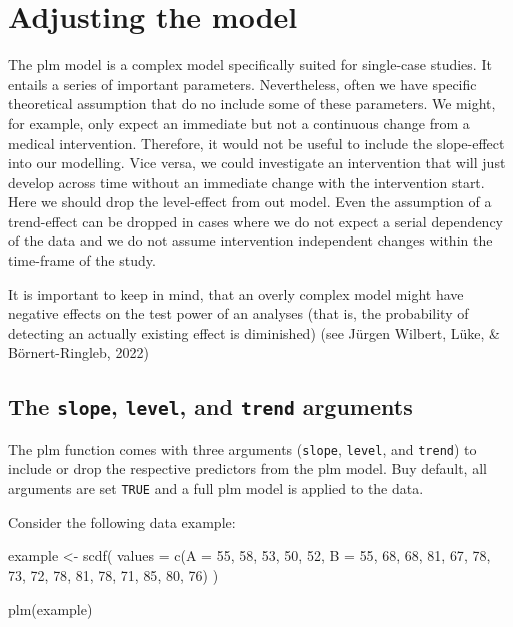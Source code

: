 \documentclass[
  letterpaper,
  DIV=11,
  numbers=noendperiod]{scrreprt}
\newenvironment{Shaded}{\begin{snugshade}}{\end{snugshade}}
\newcommand{\AttributeTok}[1]{\textcolor[rgb]{0.40,0.45,0.13}{#1}}
\newcommand{\DecValTok}[1]{\textcolor[rgb]{0.68,0.00,0.00}{#1}}
\newcommand{\FunctionTok}[1]{\textcolor[rgb]{0.28,0.35,0.67}{#1}}
\newcommand{\NormalTok}[1]{\textcolor[rgb]{0.00,0.23,0.31}{#1}}
\newcommand{\OtherTok}[1]{\textcolor[rgb]{0.00,0.23,0.31}{#1}}
\begin{document}
\hypertarget{adjusting-the-model}{%
\section{Adjusting the model}\label{adjusting-the-model}}

The plm model is a complex model specifically suited for single-case
studies. It entails a series of important parameters. Nevertheless,
often we have specific theoretical assumption that do no include some of
these parameters. We might, for example, only expect an immediate but
not a continuous change from a medical intervention. Therefore, it would
not be useful to include the slope-effect into our modelling. Vice
versa, we could investigate an intervention that will just develop
across time without an immediate change with the intervention start.
Here we should drop the level-effect from out model. Even the assumption
of a trend-effect can be dropped in cases where we do not expect a
serial dependency of the data and we do not assume intervention
independent changes within the time-frame of the study.

It is important to keep in mind, that an overly complex model might have
negative effects on the test power of an analyses (that is, the
probability of detecting an actually existing effect is diminished) (see
Jürgen Wilbert, Lüke, \& Börnert-Ringleb, 2022)

\hypertarget{the-slope-level-and-trend-arguments}{%
\subsection{\texorpdfstring{The \texttt{slope}, \texttt{level}, and
\texttt{trend}
arguments}{The slope, level, and trend arguments}}\label{the-slope-level-and-trend-arguments}}

The plm function comes with three arguments (\texttt{slope},
\texttt{level}, and \texttt{trend}) to include or drop the respective
predictors from the plm model. Buy default, all arguments are set
\texttt{TRUE} and a full plm model is applied to the data.

Consider the following data example:

\begin{Shaded}
\begin{Highlighting}[]
\NormalTok{example }\OtherTok{\textless{}{-}} \FunctionTok{scdf}\NormalTok{(}
   \AttributeTok{values =} \FunctionTok{c}\NormalTok{(}\AttributeTok{A =} \DecValTok{55}\NormalTok{, }\DecValTok{58}\NormalTok{, }\DecValTok{53}\NormalTok{, }\DecValTok{50}\NormalTok{, }\DecValTok{52}\NormalTok{, }
              \AttributeTok{B =} \DecValTok{55}\NormalTok{, }\DecValTok{68}\NormalTok{, }\DecValTok{68}\NormalTok{, }\DecValTok{81}\NormalTok{, }\DecValTok{67}\NormalTok{, }\DecValTok{78}\NormalTok{, }\DecValTok{73}\NormalTok{, }\DecValTok{72}\NormalTok{, }\DecValTok{78}\NormalTok{, }\DecValTok{81}\NormalTok{, }\DecValTok{78}\NormalTok{, }\DecValTok{71}\NormalTok{, }\DecValTok{85}\NormalTok{, }\DecValTok{80}\NormalTok{, }\DecValTok{76}\NormalTok{)}
\NormalTok{)}

\FunctionTok{plm}\NormalTok{(example)}
\end{Highlighting}
\end{Shaded}
\end{document}
